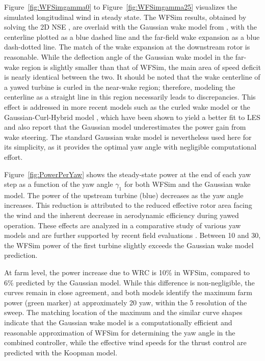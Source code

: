 Figure~\ref{fig:WFSimgamma0} to Figure~\ref{fig:WFSimgamma25} visualizes the simulated longitudinal wind in steady state. The WFSim results, obtained by solving the 2D NSE \cite{boersma2018control}, are overlaid with the Gaussian wake model from \cite{bastankhah2016experimental}, with the centerline plotted as a blue dashed line and the far-field wake expansion as a blue dash-dotted line. The match of the wake expansion at the downstream rotor is reasonable. While the deflection angle of the Gaussian wake model in the far-wake region is slightly smaller than that of WFSim, the main area of speed deficit is nearly identical between the two. It should be noted that the wake centerline of a yawed turbine is curled in the near-wake region; therefore, modeling the centerline as a straight line in this region necessarily leads to discrepancies. This effect is addressed in more recent models such as the curled wake model \cite{martinez2019aerodynamics} or the Gaussian-Curl-Hybrid model \cite{king2020controls}, which have been shown to yield a better fit to LES and also report that the Gaussian model underestimates the power gain from wake steering. The standard Gaussian wake model is nevertheless used here for its simplicity, as it provides the optimal yaw angle with negligible computational effort.

Figure~\ref{fig:PowerPerYaw} shows the steady-state power at the end of each yaw step as a function of the yaw angle $\gamma_1$ for both WFSim and the Gaussian wake model. The power of the upstream turbine (blue) decreases as the yaw angle increases. This reduction is attributed to the reduced effective rotor area facing the wind and the inherent decrease in aerodynamic efficiency during yawed operation. These effects are analyzed in a comparative study of various yaw models \cite{sant2016comparing} and are further supported by recent field evaluations \cite{hulsman2022turbine}. Between 10\textdegree{} and 30\textdegree{}, the WFSim power of the first turbine slightly exceeds the Gaussian wake model prediction.

At farm level, the power increase due to WRC is 10\% in WFSim, compared to 6\% predicted by the Gaussian model. While this difference is non-negligible, the curves remain in close agreement, and both models identify the maximum farm power (green marker) at approximately 20\textdegree{} yaw, within the 5\textdegree{} resolution of the sweep. The matching location of the maximum and the similar curve shapes indicate that the Gaussian wake model is a computationally efficient and reasonable approximation of WFSim for determining the yaw angle in the combined controller, while the effective wind speeds for the thrust control are predicted with the Koopman model.

